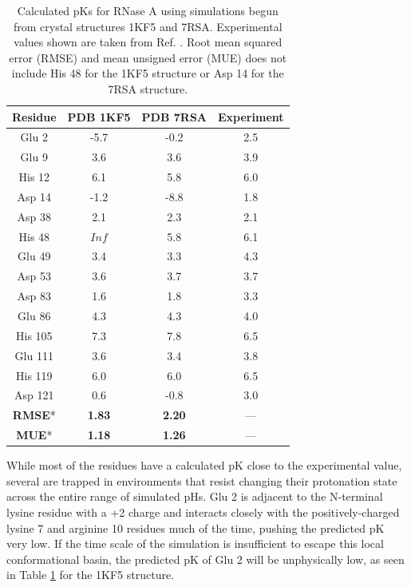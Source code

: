 \begin{table}
   \caption{Calculated pKs for RNase A using simulations begun from
            crystal structures 1KF5 and 7RSA. Experimental values shown are
            taken from Ref. .
            Root mean squared error (RMSE) and mean unsigned error (MUE) does
            not include His 48 for the 1KF5 structure or Asp 14 for the 7RSA
            structure.}
   \begin{tabular}{cccc}
      Residue & PDB 1KF5 & PDB 7RSA & Experiment
                               \cite{Baker_ArchBiochemBiophys_1996_v327_p189} \\
      \hline
      Glu 2 & -5.7 & -0.2 & 2.5 \\
      Glu 9 & 3.6 & 3.6 & 3.9 \\
      His 12 & 6.1 & 5.8 & 6.0 \\
      Asp 14 & -1.2 & -8.8 & 1.8 \\
      Asp 38 & 2.1 & 2.3 & 2.1 \\
      His 48 & $Inf$ & 5.8 & 6.1 \\
      Glu 49 & 3.4 & 3.3 & 4.3 \\
      Asp 53 & 3.6 & 3.7 & 3.7 \\
      Asp 83 & 1.6 & 1.8 & 3.3 \\
      Glu 86 & 4.3 & 4.3 & 4.0 \\
      His 105 & 7.3 & 7.8 & 6.5 \\
      Glu 111 & 3.6 & 3.4 & 3.8 \\
      His 119 & 6.0 & 6.0 & 6.5 \\
      Asp 121 & 0.6 & -0.8 & 3.0 \\
      \hline
      \hline
      \textbf{RMSE}* & \textbf{1.83} & \textbf{2.20} & --- \\
      \textbf{MUE}* & \textbf{1.18} & \textbf{1.26} & --- \\
      \hline
   \end{tabular}
   \label{tbl4:rnase_a_pkas}
\end{table}

While most of the residues have a calculated pK close to the experimental
value, several are trapped in environments that resist changing their
protonation state across the entire range of simulated pHs. Glu 2 is adjacent to
the N-terminal lysine residue with a +2 charge and interacts closely with the
positively-charged lysine 7 and arginine 10 residues much of the time, pushing
the predicted pK very low. If the time scale of the simulation is
insufficient to escape this local conformational basin, the predicted pK
of Glu 2 will be unphysically low, as seen in Table \ref{tbl4:rnase_a_pkas} for
the 1KF5 structure.

